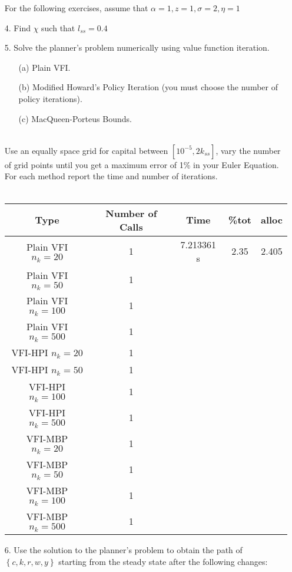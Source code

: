 \documentclass[a4paper]{article}
\begin{document}
\begin{enumerate}
For the  following exercises, assume that $\alpha=1, z=1, \sigma=2, \eta = 1$
\item[4.] Find $\chi$ such that $l_{ss} = 0.4$
\item[5.] Solve the planner's problem numerically using value function iteration.
\begin{enumerate}
\item[(a)] Plain VFI.
\item[(b)] Modified Howard’s Policy Iteration (you must choose the number of policy iterations).
\item[(c)] MacQueen-Porteus Bounds.\\~\
\end{enumerate}

Use an equally space grid for capital between $[10^{-5}, 2k_{ss}]$, vary the number of grid points until you get a maximum error of 1\% in your Euler Equation. For each method report the time and number of iterations.\\~\

\begin{table}[htbp]
\centering
\begin{tabular}{|ccccc|}
\hline
Type & Number of Calls & Time & \%tot & alloc \\
\hline
Plain VFI $n_k=20$ & 1 & 7.213361 s & 2.35 & 2.405 \\
Plain VFI $n_k=50$ & 1 &  &  &  \\
Plain VFI $n_k=100$ & 1 &  &  &  \\
Plain VFI $n_k=500$ &1  &  &  &  \\
VFI-HPI $n_k=20$ & 1 &  &  &  \\
VFI-HPI $n_k=50$& 1 &  &  &  \\
VFI-HPI $n_k=100$& 1 &  &  &  \\
VFI-HPI $n_k=500$&  1&  &  &  \\
VFI-MBP  $n_k=20$ &  1&  &  &  \\
VFI-MBP $n_k=50$& 1 &  &  &  \\
VFI-MBP $n_k=100$& 1 &  &  &  \\
VFI-MBP $n_k=500$&  1&  &  & 
\end{tabular}
\end{table}

\item[6.] Use the solution to the planner’s problem to obtain the path of $\left\lbrace c, k, r, w, y \right\rbrace$ starting from the steady state after the following changes: \\~\


\end{enumerate}
\end{document}
